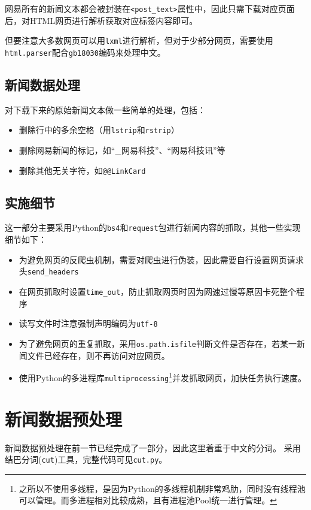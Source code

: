 \documentclass[logo,reportComp]{thesis}
\begin{document}
网易所有的新闻文本都会被封装在\verb'<post_text>'属性中，因此只需下载对应页面后，对HTML网页进行解析获取对应标签内容即可。

但要注意大多数网页可以用\verb'lxml'进行解析，但对于少部分网页，需要使用\verb'html.parser'配合\verb'gb18030'编码来处理中文。

\subsection{新闻数据处理}
对下载下来的原始新闻文本做一些简单的处理，包括：
\begin{itemize}
\item 删除行中的多余空格（用\verb'lstrip'和\verb'rstrip'）
\item 删除网易新闻的标记，如``\_网易科技''、``网易科技讯''等
\item 删除其他无关字符，如\verb'@@LinkCard'
\end{itemize}

\subsection{实施细节}
这一部分主要采用Python的\verb'bs4'和\verb'request'包进行新闻内容的抓取，其他一些实现细节如下：
\begin{itemize}
\item 为避免网页的反爬虫机制，需要对爬虫进行伪装，因此需要自行设置网页请求头\verb'send_headers'
\item 在网页抓取时设置\verb'time_out'，防止抓取网页时因为网速过慢等原因卡死整个程序
\item 读写文件时注意强制声明编码为\verb'utf-8'
\item 为了避免网页的重复抓取，采用\verb'os.path.isfile'判断文件是否存在，若某一新闻文件已经存在，则不再访问对应网页。
\item 使用Python的多进程库\verb'multiprocessing'\footnote{之所以不使用多线程，是因为Python的多线程机制非常鸡肋，同时没有线程池可以管理。而多进程相对比较成熟，且有进程池Pool统一进行管理。}并发抓取网页，加快任务执行速度。
\end{itemize}


\section{新闻数据预处理}

新闻数据预处理在前一节已经完成了一部分，因此这里着重于中文的分词。
采用结巴分词(\verb'cut')工具，完整代码可见\verb'cut.py'。
\end{document}
